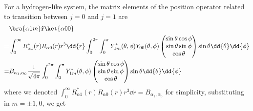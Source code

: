 \documentclass[12pt]{article}
\begin{document}
        \subsubsection{} For a hydrogen-like system, the matrix elements of the position operator related to transition between \(j = 0\) and \(j = 1\) are \begin{align*}
            &\bra{\alpha 1m} \hat{\bf r} \ket{\alpha 00} \\
            =& \int_0^{\infty} R^*_{\alpha 1} (r) R_{\alpha 0}(r) r^3 \dd{r} \int_0^{2\pi} \int_0^\pi Y^*_{1m}(\theta,\phi)  Y_{00}(\theta,\phi)  \begin{pmatrix} \sin\theta\cos\phi\\ \sin\theta \sin\phi\\ \cos\theta \end{pmatrix} \sin\theta \dd{\theta}   \dd{\phi}\\
            =&B_{\alpha_1,\alpha_0} \frac{1}{\sqrt{4\pi}}\int_0^{2\pi} \int_0^\pi Y^*_{1m}(\theta,\phi)   \begin{pmatrix} \sin\theta\cos\phi\\ \sin\theta \sin\phi\\ \cos\theta \end{pmatrix} \sin\theta \dd{\theta}   \dd{\phi}   
        \end{align*} 
        where we denoted \(\int_0^{\infty} R^*_{\alpha 1} (r) R_{\alpha 0}(r) r^3 \dd{r} =B_{\alpha_1,\alpha_0}\) for simplicity, substituting in \(m =\pm 1,0\), we get
\end{document}
